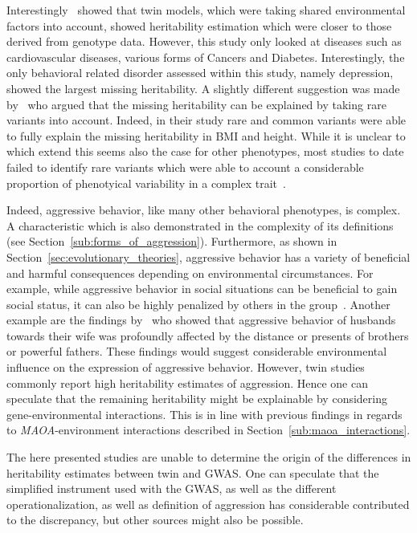 Interestingly~\citet{Munoz2016a} showed that twin models, which were taking shared environmental factors into account, showed heritability estimation which were closer to those derived from genotype data.
However, this study only looked at diseases such as cardiovascular diseases, various forms of Cancers and Diabetes.
Interestingly, the only behavioral related disorder assessed within this study, namely depression, showed the largest missing heritability.
A slightly different suggestion was made by~\citet{Yang2015} who argued that the missing heritability can be explained by taking rare variants into account.
Indeed, in their study rare and common variants were able to fully explain the missing heritability in BMI and height.
While it is unclear to which extend this seems also the case for other phenotypes, most studies to date failed to identify rare variants which were able to account a considerable proportion of phenotyical variability in a complex trait~\cite{Chabris2015,Wray2011}.

Indeed, aggressive behavior, like many other behavioral phenotypes, is complex.
A characteristic which is also demonstrated in the complexity of its definitions (see Section~\ref{sub:forms_of_aggression}).
Furthermore, as shown in Section~\ref{sec:evolutionary_theories}, aggressive behavior has a variety of beneficial and harmful consequences depending on environmental circumstances. 
For example, while aggressive behavior in social situations can be beneficial to gain social status, it can also be highly penalized by others in the group~\cite{Buss1997}.
Another example are the findings by~\citet{Figueredo1995} who showed that aggressive behavior of husbands towards their wife was profoundly affected by the distance or presents of brothers or powerful fathers.
These findings would suggest considerable environmental influence on the expression of aggressive behavior.
However, twin studies commonly report high heritability estimates of aggression.
Hence one can speculate that the remaining heritability might be explainable by considering gene-environmental interactions.
This is in line with previous findings in regards to \textit{MAOA}-environment interactions described in Section~\ref{sub:maoa_interactions}.

The here presented studies are unable to determine the origin of the differences in heritability estimates between twin and GWAS\@.
One can speculate that the simplified instrument used with the GWAS, as well as the different operationalization, as well as definition of aggression has considerable contributed to the discrepancy, but other sources might also be possible.

